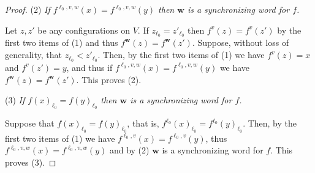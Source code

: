 \documentclass[11pt,letter]{article}
\newcommand{\W}{{\mathbf{w}}}
\begin{document}
\begin{proof}
\bigskip
\noindent
(2) {\em If $f^{\ell_0,v,w}(x)=f^{\ell_0,v,w}(y)$ then $\W$ is a synchronizing word for $f$.}

\medskip
\noindent
Let $z,z'$ be any configurations on $V$. If $z_{\ell_0}=z'_{\ell_0}$ then $f^v(z)=f^v(z')$ by the first two items of (1) and thus $f^\W(z)=f^\W(z')$. Suppose, without loss of generality, that $z_{\ell_0}< z'_{\ell_0}$. Then, by the first two items of (1) we have $f^v(z)=x$ and $f^v(z')=y$, and thus if $f^{\ell_0,v,w}(x)=f^{\ell_0,v,w}(y)$ we have $f^\W(z)=f^\W(z')$. This proves (2).

\bigskip
\noindent
(3) {\em If $f(x)_{\ell_0}=f(y)_{\ell_0}$ then $\W$ is a synchronizing word for $f$.}

\medskip
\noindent
Suppose that $f(x)_{\ell_0}=f(y)_{\ell_0}$, that is, $f^{\ell_0}(x)_{\ell_0}=f^{\ell_0}(y)_{\ell_0}$. Then, by the first two items of (1) we have $f^{\ell_0,v}(x)=f^{\ell_0,v}(y)$, thus $f^{\ell_0,v,w}(x)=f^{\ell_0,v,w}(y)$ and by (2) $\W$ is a synchronizing word for $f$. This proves (3). 


\end{proof}
\end{document}
